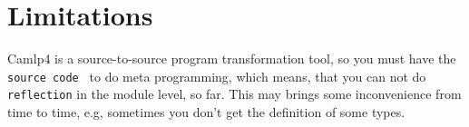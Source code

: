 \section{Limitations}

Camlp4 is a source-to-source program transformation tool, so you must
have the \verb|source code | to do meta programming, which means, that
you can not do \verb|reflection| in the module level, so far. This may
brings some inconvenience from time to time, e.g, sometimes you don't
get the definition of some types.
